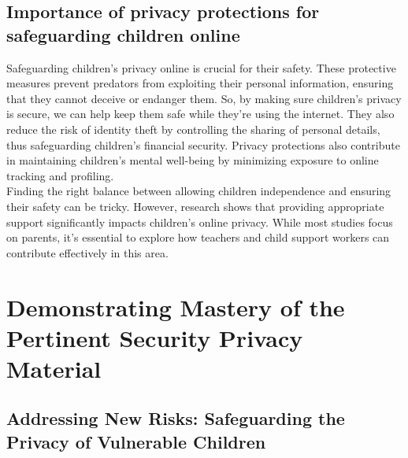 \documentclass[a4paper, 10 pt, conference]{ieeeconf}  %
\begin{document}
\subsection{Importance of privacy protections for safeguarding children online}
Safeguarding children’s privacy online is crucial for their safety. These protective measures prevent predators from exploiting their personal information, ensuring that they cannot deceive or endanger them. So, by making sure children’s privacy is secure, we can help keep them safe while they’re using the internet. They also reduce the risk of identity theft by controlling the sharing of personal details, thus safeguarding children’s financial security. Privacy protections also contribute in maintaining children’s mental well-being by minimizing exposure to online tracking and profiling.
\\ Finding the right balance between allowing children independence and ensuring their safety can be tricky. However, research shows that providing appropriate support significantly impacts children’s online privacy. While most studies focus on parents, it’s essential to explore how teachers and child support workers can contribute effectively in this area.


\section{Demonstrating Mastery of the Pertinent Security Privacy Material}

\subsection{Addressing New Risks: Safeguarding the Privacy of Vulnerable Children}
\end{document}
